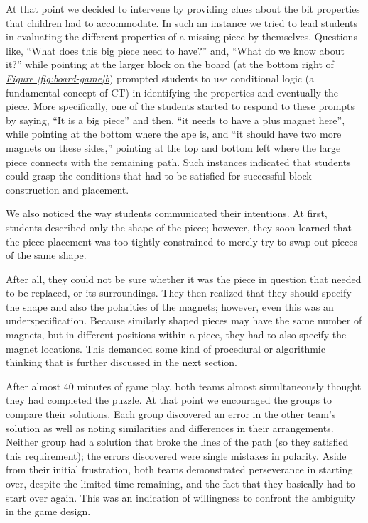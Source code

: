 \documentclass{acm_proc_article-sp}
\begin{document}
At that point we decided to intervene by providing clues about the bit properties that children had to accommodate. 
In such an instance we tried to lead students in evaluating the different properties of a missing piece by themselves. 
Questions like, ``What does this big piece need to have?'' and, ``What do we know about it?'' while pointing at the larger block on the board (at the bottom right of {\em \hyperref[fig:board-game]{Figure \ref{fig:board-game}b}}) prompted students to use conditional logic (a fundamental concept of CT) in identifying the properties and eventually the piece. 
More specifically, one of the students started to respond to these prompts by saying, ``It is a big piece'' and then, ``it needs to have a plus magnet here'', while pointing at the bottom where the ape is, and ``it should have two more magnets on these sides,'' pointing at the top and bottom left where the large piece connects with the remaining path. 
Such instances indicated that students could grasp the conditions that had to be satisfied for successful block construction and placement.

We also noticed the way students communicated their intentions. 
At first, students described only the shape of the piece; however, they soon learned that the piece placement was too tightly constrained to merely try to swap out pieces of the same shape. 

After all, they could not be sure whether it was the piece in question that needed to be replaced, or its surroundings. 
They then realized that they should specify the shape and also the polarities of the magnets; however, even this was an underspecification. 
Because similarly shaped pieces may have the same number of magnets, but in different positions within a piece, they had to also specify the magnet locations. 
This demanded some kind of procedural or algorithmic thinking that is further discussed in the next section.

After almost 40 minutes of game play, both teams almost simultaneously thought they had completed the puzzle. 
At that point we encouraged the groups to compare their solutions. Each group discovered an error in the other team's solution as well as noting similarities and differences in their arrangements. 
Neither group had a solution that broke the lines of the path (so they satisfied this requirement); the errors discovered were single mistakes in polarity. 
Aside from their initial frustration, both teams demonstrated perseverance in starting over, despite the limited time remaining, and the fact that they basically had to start over again. This was an indication of willingness to confront the ambiguity in the game design.
\end{document}
